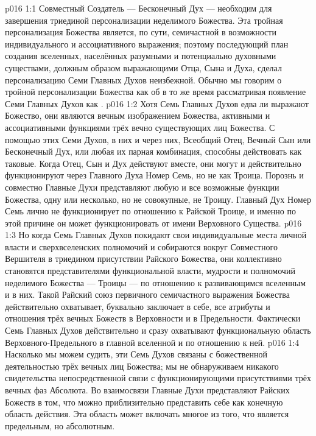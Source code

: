 \vs p016 1:1 Совместный Создатель --- Бесконечный Дух --- необходим для завершения триединой персонализации неделимого Божества. Эта тройная персонализация Божества является, по сути, семичастной в возможности индивидуального и ассоциативного выражения; поэтому последующий план создания вселенных, населённых разумными и потенциально духовными существами, должным образом выражающими Отца, Сына и Духа, сделал персонализацию Семи Главных Духов неизбежной. Обычно мы говорим о тройной персонализации Божества как об  в то же время рассматривая появление Семи Главных Духов как .
\vs p016 1:2 Хотя Семь Главных Духов едва ли выражают  Божество, они являются вечным изображением  Божества, активными и ассоциативными функциями трёх вечно существующих лиц Божества. С помощью этих Семи Духов, в них и через них, Всеобщий Отец, Вечный Сын или Бесконечный Дух, или любая их парная комбинация, способны действовать как таковые. Когда Отец, Сын и Дух действуют вместе, они могут и действительно функционируют через Главного Духа Номер Семь, но не как Троица. Порознь и совместно Главные Духи представляют любую и все возможные функции Божества, одну или несколько, но не совокупные, не Троицу. Главный Дух Номер Семь лично не функционирует по отношению к Райской Троице, и именно по этой причине он может функционировать  от имени Верховного Существа.
\vs p016 1:3 Но когда Семь Главных Духов покидают свои индивидуальные места личной власти и сверхвселенских полномочий и собираются вокруг Совместного Вершителя в триедином присутствии Райского Божества, они коллективно становятся представителями функциональной власти, мудрости и полномочий неделимого Божества --- Троицы --- по отношению к развивающимся вселенным и в них. Такой Райский союз первичного семичастного выражения Божества действительно охватывает, буквально заключает в себе, все атрибуты и отношения трёх вечных Божеств в Верховности и в Предельности. Фактически Семь Главных Духов действительно и сразу охватывают функциональную область Верховного\hyp{}Предельного в главной вселенной и по отношению к ней.
\vs p016 1:4 Насколько мы можем судить, эти Семь Духов связаны с божественной деятельностью трёх вечных лиц Божества; мы не обнаруживаем никакого свидетельства непосредственной связи с функционирующими присутствиями трёх вечных фаз Абсолюта. Во взаимосвязи Главные Духи представляют Райских Божеств в том, что можно приблизительно представить себе как конечную область действия. Эта область может включать многое из того, что является предельным, но  абсолютным.
